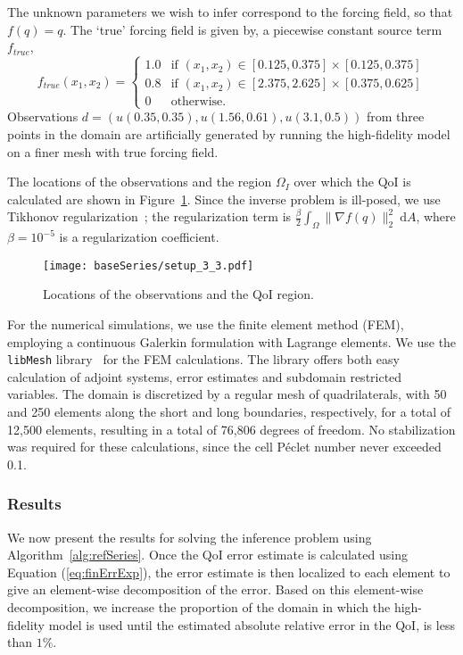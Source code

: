 The unknown parameters we wish to infer correspond to the forcing field, so that $f(q)=q$. The `true' forcing field is given by,
a piecewise constant source term $f_{true}$,
%
\begin{equation}
f_{true}(x_1,x_2)=
\begin{cases}
1.0 & \textrm{if }(x_1,x_2)\in[0.125,0.375]\times[0.125,0.375] \\
0.8 & \textrm{if }(x_1,x_2)\in[2.375,2.625]\times[0.375,0.625] \\
0 & \textrm{otherwise}.
\end{cases}
\end{equation}
%
Observations $d=(u(0.35,0.35),u(1.56,0.61),u(3.1,0.5))$ from three points in the domain are artificially generated by running the high-fidelity model on a finer mesh with true forcing field. 

The locations of the observations and the region $\Omega_I$ over which the QoI is calculated are shown in Figure~\ref{fig:baseSetup}. Since the inverse problem is ill-posed, we use Tikhonov regularization~\cite{EngHanNeu00}; the regularization term is $\frac{\beta}{2}\int_\Omega \|\nabla f(q)\|_2^2\:\textrm{d}A$, where $\beta=10^{-5}$ is a regularization coefficient.
%
\begin{figure}[h]
\centering
\texttt{[image: baseSeries/setup\_3\_3.pdf]}
\caption{Locations of the observations and the QoI region.}
\label{fig:baseSetup}
\end{figure}
%
For the numerical simulations, we use the finite element method (FEM), employing a continuous Galerkin formulation with Lagrange elements. We use the \texttt{libMesh} library~\cite{libMeshPaper} for the FEM calculations. The library offers both easy calculation of adjoint systems, error estimates and subdomain restricted variables. The domain is discretized by a regular mesh of quadrilaterals, with 50 and 250 elements along the short and long boundaries, respectively, for a total of 12,500 elements, resulting in a total of 76,806 degrees of freedom. No stabilization was required for these calculations, since the cell P\'{e}clet number never exceeded 0.1.
%
\subsubsection{Results} \label{sec:cdvcdrBaseRef} 
%
We now present the results for solving the inference problem using Algorithm~\ref{alg:refSeries}. Once the QoI error estimate is calculated using Equation (\ref{eq:finErrExp}), the error estimate is then localized to each element to give an element-wise decomposition of the error. Based on this element-wise decomposition, we increase the proportion of the domain in which the high-fidelity model is used until the estimated absolute relative error in the QoI, is less than $1\%$. 

